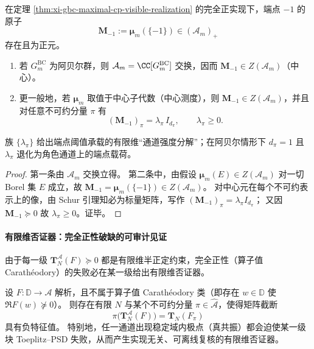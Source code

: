 \begin{theorem}\label{thm:xi-endpoint-atom-central-channel-strength}
在定理 \ref{thm:xi-gbc-maximal-cp-visible-realization} 的完全正实现下，端点 \(-1\) 的原子
\[
\mathbf{M}_{-1}:=\boldsymbol\mu_m(\{-1\})\in(\mathcal{A}_m)_+
\]
存在且为正元。
\begin{enumerate}
  \item 若 \(G^{\mathrm{BC}}_m\) 为阿贝尔群，则 \(\mathcal{A}_m=\CC[G^{\mathrm{BC}}_m]\) 交换，因而 \(\mathbf{M}_{-1}\in Z(\mathcal{A}_m)\)（中心）。
  \item 更一般地，若 \(\boldsymbol\mu_m\) 取值于中心子代数（中心测度），则 \(\mathbf{M}_{-1}\in Z(\mathcal{A}_m)\)，并且对任意不可约分量 \(\pi\) 有
  \begin{equation}\label{eq:xi-endpoint-atom-channel-strength}
  \boxed{\;
  (\mathbf{M}_{-1})_\pi=\lambda_\pi\,I_{d_\pi},\qquad \lambda_\pi\ge 0.\;}
  \end{equation}
\end{enumerate}
族 \(\{\lambda_\pi\}\) 给出端点阈值承载的有限维“通道强度分解”；在阿贝尔情形下 \(d_\pi=1\) 且 \(\lambda_\pi\) 退化为角色通道上的端点载荷。
\end{theorem}

\begin{proof}
第一条由 \(\mathcal{A}_m\) 交换立得。
第二条中，由假设 \(\boldsymbol\mu_m(E)\in Z(\mathcal{A}_m)\) 对一切 Borel 集 \(E\) 成立，故 \(\mathbf{M}_{-1}=\boldsymbol\mu_m(\{-1\})\in Z(\mathcal{A}_m)\)。
对中心元在每个不可约表示上的像，由 Schur 引理知必为标量矩阵，写作 \((\mathbf{M}_{-1})_\pi=\lambda_\pi I_{d_\pi}\)；
又因 \(\mathbf{M}_{-1}\succeq 0\) 故 \(\lambda_\pi\ge 0\)。证毕。
\end{proof}

\paragraph{有限维否证器：完全正性破缺的可审计见证}
由于每一级 \(\mathbf{T}^{\mathcal{A}}_N(F)\succeq 0\) 都是有限维半正定约束，完全正性（算子值 Carath\'eodory）的失败必在某一级给出有限维否证器。

\begin{corollary}[完全正性破缺 \texorpdfstring{$\Rightarrow$}{=>} 有限阶块负惯性]\label{cor:xi-cp-breakdown-finite-witness}
设 \(F:\mathbb{D}\to\mathcal{A}\) 解析，且不属于算子值 Carath\'eodory 类（即存在 \(w\in\mathbb{D}\) 使 \(\Re F(w)\nsucceq 0\)）。
则存在有限 \(N\) 与某个不可约分量 \(\pi\in\widehat{\mathcal{A}}\)，使得矩阵截断
\[
\pi\!\bigl(\mathbf{T}^{\mathcal{A}}_N(F)\bigr)=\mathbf{T}_N(F_\pi)
\]
具有负特征值。
特别地，任一通道出现稳定域内极点（真共振）都会迫使某一级块 Toeplitz--PSD 失败，从而产生实现无关、可离线复核的有限维否证器。
\end{corollary}

